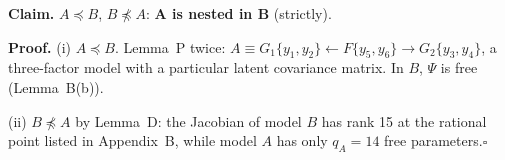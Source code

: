 \documentclass[10pt,a4paper]{article}
\newcommand{\nest}{\preceq}
\newcommand{\nnest}{\not\preceq}
\begin{document}
\par\bigskip
\noindent\textbf{Claim.} $A \nest B$, $B \nnest A$: \textbf{A is nested in B} (strictly).\par\smallskip
\noindent\textbf{Proof.} (i) $A\nest B$. Lemma~P twice: $A\equiv G_1\{y_1,y_2\}\leftarrow F\{y_5,y_6\}\rightarrow G_2\{y_3,y_4\}$, a three-factor model with a particular latent covariance matrix. In $B$, $\Psi$ is free (Lemma~B(b)).\par\smallskip
\noindent(ii) $B\nnest A$ by Lemma~D: the Jacobian of model $B$ has rank 15 at the rational point listed in Appendix~B, while model $A$ has only $q_A=14$ free parameters.\hfill$\square$\par\medskip
{}

\clearpage
\end{document}

